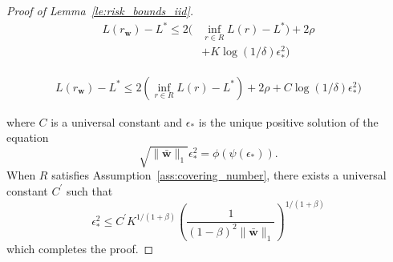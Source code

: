 \documentclass[letterpaper]{article} %
\def\DoubleColumnEnd{}
\def\SingleColumn{}
\def\SingleColumnEnd{}
\newcommand{\weight}{\mathbf{w}}
\newcommand{\verticeweight}{\bar{\mathbf{w}}}
\newcommand{\bayeserror}{L^*}
\newcommand{\risk}{L}
\newcommand{\normo}[1]{\|#1\|_1}
\newcommand{\complexbound}{\beta}
\begin{document}
\begin{proof}[Proof of Lemma~\ref{le:risk_bounds_iid}]
\begin{equation}
\begin{aligned}
            \label{eq:main_result_proof_1}
            \risk(r_\weight{})-\bayeserror \le 2(&\inf_{r\in R}\risk(r)-\bayeserror) + 2\rho \\
            &+ K\log(1/\delta)\epsilon_*^2)
        \end{aligned}
    \end{equation}
    \DoubleColumnEnd
    \SingleColumn
    \begin{equation}
        \begin{aligned}
            \label{eq:main_result_proof_1}
            \risk(r_\weight{})-\bayeserror \le 2(\inf_{r\in R}\risk(r)-\bayeserror) + 2\rho + C\log(1/\delta)\epsilon_*^2)
        \end{aligned}
    \end{equation}
    \SingleColumnEnd
    where $C$ is a universal constant and $\epsilon_*$ is the unique positive solution of the equation
    \[\sqrt{\normo{\verticeweight{}}}\epsilon_*^2=\phi(\psi(\epsilon_*)).\]
    When $ R$ satisfies Assumption~\ref{ass:covering_number}, there exists a universal constant $C^\prime$ such that
    \[\epsilon_*^2\le C^\prime K^{1/(1+\complexbound{})}(\frac{1}{(1-\complexbound{})^2\normo{\verticeweight{}}})^{1/(1+\complexbound{})}\]
    which completes the proof.
\end{proof}

\end{document}
